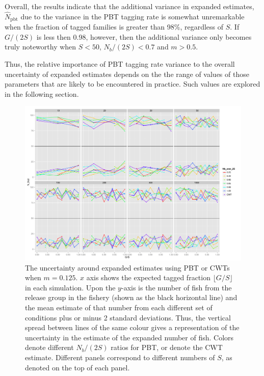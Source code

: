 \documentclass[11pt]{article}
\begin{document}
Overall, the results indicate that the additional variance in expanded estimates,
$\hat{N}_\mathrm{pbt}$ due to the variance in the PBT tagging rate is somewhat unremarkable 
when the fraction of tagged families is greater than 98\%, regardless of $S$.  If 
$G/(2S)$ is less then 0.98, however, then the additional variance only becomes truly 
noteworthy when $S<50$, $N_b/(2S) < 0.7$ and $m > 0.5$.

Thus, the relative importance of PBT tagging rate variance to the overall uncertainty of 
expanded estimates depends on the the range of values of those parameters that are
likely to be encountered in practice.  Such values are explored in the following section.

\begin{figure}
\includegraphics[width = .93\textwidth]{./images/sd_line_horns_m_0_125.pdf}
\caption{The uncertainty around expanded estimates using PBT or CWTs when $m = 0.125$.  $x$ axis shows the
expected tagged fraction $\lfloor G/S \rfloor$ in each simulation. Upon the $y$-axis is the number of fish from the
release group in the fishery (shown as the black horizontal line) and the mean estimate of that number from each different set of 
conditions plus or minus 2 standard deviations.  Thus, the vertical spread between lines of the same colour gives a representation
of the uncertainty in the estimate of the expanded number of fish. Colors denote different $N_b/(2S)$ ratios for PBT, or denote
the CWT estimate.  Different
panels correspond to different numbers of $S$, as denoted on the top of each panel.
\label{fig:horn0.125}}
\end{figure}
\end{document}

